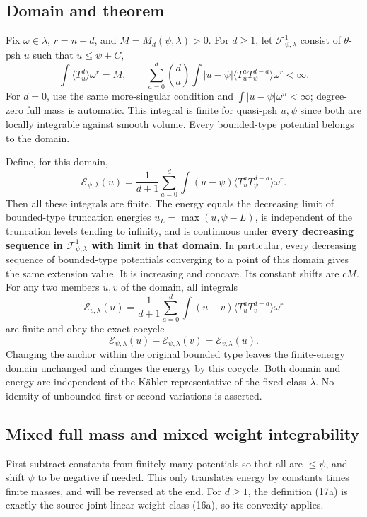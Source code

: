 \documentclass[
  11pt,
]{article}
\begin{document}
\subsection{Domain and theorem}\label{domain-and-theorem}

Fix \(\omega\in\lambda\), \(r=n-d\), and \(M=M_d(\psi,\lambda)>0\). For
\(d\geq1\), let \(\mathcal{F}^1_{\psi,\lambda}\) consist of
\(\theta\)-psh \(u\) such that \(u\leq\psi+C\), \[
\int\langle T_u^d\rangle\omega^r=M,
\qquad
\sum_{a=0}^d\binom da\int|u-\psi|
\langle T_u^aT_\psi^{d-a}\rangle\omega^r<\infty.
\tag{17a}
\] For \(d=0\), use the same more-singular condition and
\(\int|u-\psi|\omega^n<\infty\); degree-zero full mass is automatic.
This integral is finite for quasi-psh \(u,\psi\) since both are locally
integrable against smooth volume. Every bounded-type potential belongs
to the domain.

Define, for this domain, \[
\mathcal{E}_{\psi,\lambda}(u)
=\frac1{d+1}\sum_{a=0}^d\int(u-\psi)
\langle T_u^aT_\psi^{d-a}\rangle\omega^r.
\tag{18a}
\] Then all these integrals are finite. The energy equals the decreasing
limit of bounded-type truncation energies \(u_L=\max(u,\psi-L)\), is
independent of the truncation levels tending to infinity, and is
continuous under \textbf{every decreasing sequence in
\(\mathcal{F}^1_{\psi,\lambda}\) with limit in that domain}. In
particular, every decreasing sequence of bounded-type potentials
converging to a point of this domain gives the same extension value. It
is increasing and concave. Its constant shifts are \(cM\). For any two
members \(u,v\) of the domain, all integrals \[
\mathcal{E}_{v,\lambda}(u)
=\frac1{d+1}\sum_{a=0}^d\int(u-v)
\langle T_u^aT_v^{d-a}\rangle\omega^r
\tag{19a}
\] are finite and obey the exact cocycle \[
\mathcal{E}_{\psi,\lambda}(u)-\mathcal{E}_{\psi,\lambda}(v)
=\mathcal{E}_{v,\lambda}(u).
\tag{20a}
\] Changing the anchor within the original bounded type leaves the
finite-energy domain unchanged and changes the energy by this cocycle.
Both domain and energy are independent of the Kähler representative of
the fixed class \(\lambda\). No identity of unbounded first or second
variations is asserted.

\subsection{Mixed full mass and mixed weight
integrability}\label{mixed-full-mass-and-mixed-weight-integrability}

First subtract constants from finitely many potentials so that all are
\(\leq\psi\), and shift \(\psi\) to be negative if needed. This only
translates energy by constants times finite masses, and will be reversed
at the end. For \(d\geq1\), the definition (17a) is exactly the source
joint linear-weight class (16a), so its convexity applies.
\end{document}
